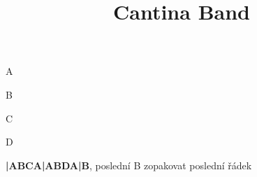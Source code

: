 \documentclass[timestamp]{jazzgrid}
\title{Cantina Band}
\begin{document}
\maketitle
\begin{musicsection}{A}
\barline
	{}
	{\barfour{}{}{}{}{}}
	{}
	{}
\barline
	{}
	{\barfour{}{}{}{}{}}
	{}
	{}
\barline
	{}
	{\barfour{}{}{}{}{}}
	{}
	{}
\barline
	{}
	{}
	{}
	{}
\end{musicsection}

\begin{musicsection}{B}
\barline
	{}
	{\barfour{}{}{}{}{}}
	{\barfour{}{}{}{}{}}
	{\barfour{}{}{}{}{}}
\barline
	{}
	{\barfour{}{}{}{}{}}
	{\barfour{}{}{}{}{}}
	{}
\barline
	{}
	{\barfour{}{}{}{}{}}
	{\barfour{}{}{}{}{}}
	{\barfour{}{}{}{}{}}
\barline
	{}
	{}
	{}
	{}
\end{musicsection}
\begin{musicsection}{C}
\barlineeight
	{}
	{\bareighttwo{}{}{}}
	{\bareighttwo{}{}{}}
	{\bareighttwo{}{}{}}
	{\bareighttwo{}{}{}}
	{\bareighttwo{}{}{}}
	{\bareighttwo{}{}{}}
	{\bareighttwo{}{}{}}
\barlineeight
	{}
	{\bareighttwo{}{}{}}
	{\bareighttwo{}{}{}}
	{\bareighttwo{}{}{}}
	{\bareighttwo{}{}{}}
	{\bareighttwo{}{}{}}
	{\bareighttwo{}{}{}}
	{\bareighttwo{}{}{}}
\end{musicsection}

\begin{musicsection}{D}
\barline
	{}
	{\barfour{}{}{}{}{}}
	{}
	{\barfour{}{}{}{}{}}
\barline
	{}
	{\barfour{}{}{}{}{}}
	{}
	{\barfour{}{}{}{}{}}
\barline
	{}
	{}
	{}
	{}
\barline
	{}
	{}
	{}
	{}
\end{musicsection}
\tiny
\textbf{|ABCA|ABDA|B}, poslední B zopakovat poslední řádek
\end{document}
